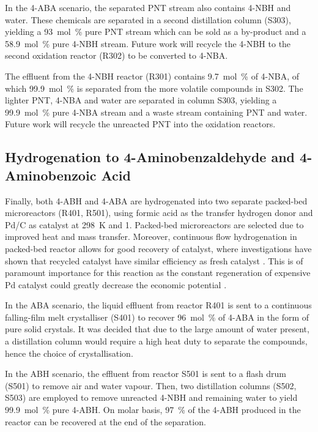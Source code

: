 In the 4-ABA scenario, the separated PNT stream also contains 4-NBH and water. These chemicals are separated in a second distillation column (S303), yielding a \SI{93}{mol\percent} pure PNT stream which can be sold as a by-product and a \SI{58.9}{mol\percent} pure 4-NBH stream. Future work will recycle the 4-NBH to the second oxidation reactor (R302) to be converted to 4-NBA.

The effluent from the 4-NBH reactor (R301) contains \SI{9.7}{mol\percent} of 4-NBA, of which \SI{99.9}{mol\percent} is separated from the more volatile compounds in S302. The lighter PNT, 4-NBA and water are separated in column S303, yielding a \SI{99.9}{mol\percent} pure 4-NBA stream and a waste stream containing PNT and water. Future work will recycle the unreacted PNT into the oxidation reactors.

\subsection{Hydrogenation to 4-Aminobenzaldehyde and 4-Aminobenzoic Acid}

Finally, both 4-ABH and 4-ABA are hydrogenated into two separate packed-bed microreactors (R401, R501), using formic acid as the transfer hydrogen donor and Pd/C as catalyst at \SI{298}{\K} and \SI{1}{\atm}. Packed-bed microreactors are selected due to improved heat and mass transfer. Moreover, continuous flow hydrogenation in packed-bed reactor allows for good recovery of catalyst, where investigations have shown that recycled catalyst have similar efficiency as fresh catalyst \cite{rahman_fast_2020}. This is of paramount importance for this reaction as the constant regeneration of expensive Pd catalyst could greatly decrease the economic potential \cite{rahman_fast_2020}. 


In the ABA scenario, the liquid effluent from reactor R401 is sent to a continuous falling-film melt crystalliser (S401) to recover \SI{96}{mol\percent} of 4-ABA in the form of pure solid crystals. It was decided that due to the large amount of water present, a distillation column would require a high heat duty to separate the compounds, hence the choice of crystallisation. %

 In the ABH scenario, the effluent from reactor S501 is sent to a flash drum (S501) to remove air and water vapour. Then, two distillation columns (S502, S503) are employed to remove unreacted 4-NBH and remaining water to yield  \SI{99.9}{mol\percent} pure 4-ABH. On molar basis, \SI{97}{\percent} of the 4-ABH produced in the reactor can be recovered at the end of the separation.

